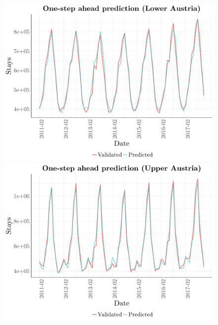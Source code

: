 \documentclass[a4paper,reqno,]{article}
\begin{document}
\begin{figure}[h!]
\begin{minipage}[h!]{0.33\textwidth}
\end{minipage}
\begin{minipage}[h!]{0.33\textwidth}
\centering
    \includegraphics[width=1\textwidth]{images/RFR/Lower_Austria_one_step_ahead.pdf}
\end{minipage}
\begin{minipage}[h!]{0.33\textwidth}
\centering
    \includegraphics[width=1\textwidth]{images/RFR/Upper_Austria_one_step_ahead.pdf}
\end{minipage}
\begin{minipage}[h!]{0.33\textwidth}
\centering

\end{minipage}
\end{figure}
\end{document}
